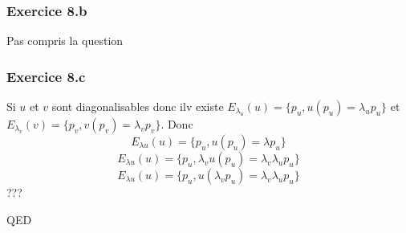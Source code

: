 \documentclass[]{book}
\theoremstyle{definition}
\begin{document}
\subsubsection*{Exercice 8.b}
Pas compris la question

\subsubsection*{Exercice 8.c}
Si $u$ et $v$ sont diagonalisables donc ilv existe $E_{\lambda_{u}}(u) = \{p_u, u(p_u) = \lambda_{u} p_u\}$ et $E_{\lambda_{v}}(v) = \{p_v, v(p_v) = \lambda_{v} p_v\}$. Donc
$$E_{\lambda u}(u) = \{p_u, u(p_u) = \lambda p_u\}$$
$$E_{\lambda u}(u) = \{p_u, \lambda_{v} u(p_u) = \lambda_{v} \lambda_{u} p_u\}$$
$$E_{\lambda u}(u) = \{p_u, u(\lambda_{v} p_u) = \lambda_{v} \lambda_{u} p_u\}$$
???



QED
\end{document}
